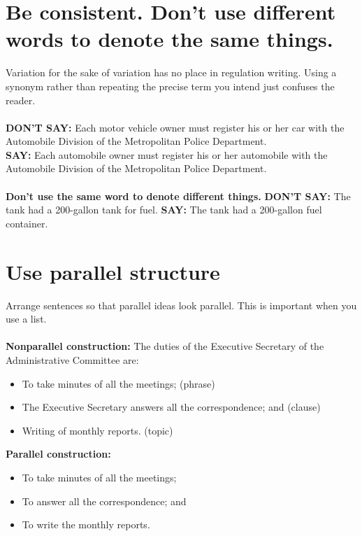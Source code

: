 \documentclass[12pt, letterpaper]{report}
\begin{document}
\begin{linenumbers}
    \section{Be consistent. Don't use different words to denote the same things.}
    Variation for the sake of variation has no place in regulation writing. Using a synonym rather than repeating the precise term you intend just confuses the reader.\\\\
    \textbf{DON'T SAY: }Each motor vehicle owner must register his or her car with the Automobile Division of the Metropolitan Police Department.\\
    \textbf{SAY: }Each automobile owner must register his or her automobile with the Automobile Division of the Metropolitan Police Department.\\\\
    \textbf{Don't use the same word to denote different things.}
    \textbf{DON'T SAY:} The tank had a 200-gallon tank for fuel.
    \textbf{SAY: }The tank had a 200-gallon fuel container.
    \section{Use parallel structure}
    Arrange sentences so that parallel ideas look parallel. This is important when you use a list.\\\\
    \textbf{Nonparallel construction:}
    The duties of the Executive Secretary of the Administrative Committee are:
\begin{itemize}
    \item To take minutes of all the meetings; (phrase)
\item    The Executive Secretary answers all the correspondence; and (clause)
    \item Writing of monthly reports. (topic)

\end{itemize}
    
\textbf{Parallel construction:}
\begin{itemize}
    \item To take minutes of all the meetings;
\item    To answer all the correspondence; and
    \item To write the monthly reports.
\end{itemize}

\end{linenumbers}
\end{document}
